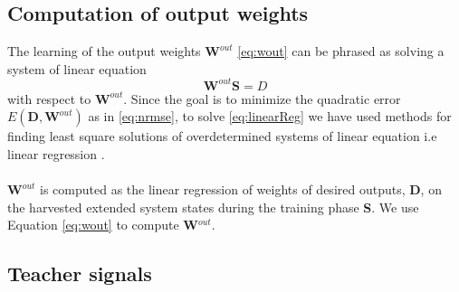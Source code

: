 \subsection{Computation of output weights}
\indent \indent
The learning of the output weights $\mathbf{W}^{out}$ \eqref{eq:wout} can be phrased as solving a system of linear equation
\begin{equation}
	\mathbf{W}^{out} \mathbf{S} = D
	\label{eq:linearReg}
	\end{equation}
with respect to $\mathbf{W}^{out}$. Since the goal is to minimize the quadratic error $E(\mathbf{D},\mathbf{W}^{out})$  as in \eqref{eq:nrmse}, to solve \eqref{eq:linearReg} we have used methods for finding least square solutions of overdetermined systems of linear equation i.e linear regression \cite{reservoirComputing}.\\ \\

	 $\mathbf{W}^{out}$ is computed as the linear regression of weights of  
	    desired outputs, $\mathbf{D}$, on the harvested extended system states during the training phase \textbf{S}. We use Equation \eqref{eq:wout} to compute \textbf{W}$^{out}$.
		

\subsection{Teacher signals}


 